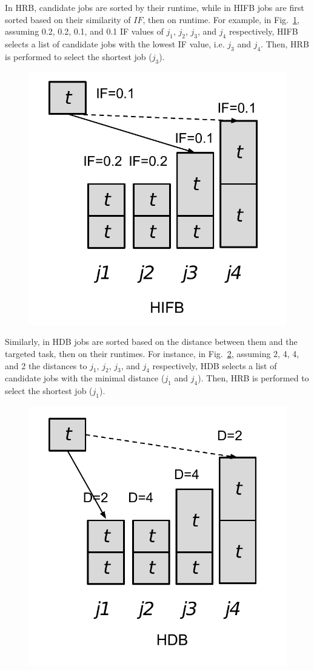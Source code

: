 \documentclass[final]{IEEEtran}
\begin{document}
In HRB, candidate jobs are sorted by their runtime, while in HIFB jobs are first sorted based on their similarity of $IF$, then on runtime. For example, in Fig.~\ref{fig:algorithm_hifb}, assuming 0.2, 0.2, 0.1, and 0.1 IF values of $j_1$, $j_2$, $j_3$, and $j_4$ respectively, HIFB selects a list of candidate jobs with the lowest IF value, i.e. $j_3$ and $j_4$. Then, HRB is performed to select the shortest job ($j_3$). 

\begin{figure}[htb]
	\centering
	\includegraphics[width=0.5\linewidth]{figure/algorithm_hifb.pdf}
	\label{fig:algorithm_hifb}
	\vspace{-10pt}
\end{figure}

Similarly, in HDB jobs are sorted based on the distance between them and the targeted task, then on their runtimes. For instance, in Fig.~\ref{fig:algorithm_hdb}, assuming 2, 4, 4, and 2 the distances to $j_1$, $j_2$, $j_3$, and $j_4$ respectively, HDB selects a list of candidate jobs with the minimal distance ($j_1$ and $j_4$). Then, HRB is performed to select the shortest job ($j_1$). 

\begin{figure}[htb]
	\centering
	\includegraphics[width=0.5\linewidth]{figure/algorithm_hdb.pdf}
	\label{fig:algorithm_hdb}
	\vspace{-10pt}
\end{figure}
\end{document}
